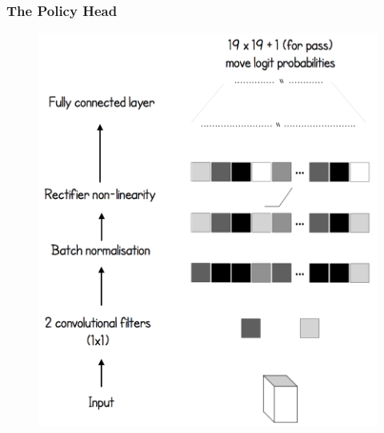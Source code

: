 \documentclass[notheorems, aspectratio=54]{beamer}
\begin{document}
\begin{frame}
    \frametitle{The Policy Head}

    \begin{figure}
        \includegraphics[height=0.9\textheight]{fig/the_policy_head.png}
    \end{figure}
\end{frame}
\end{document}
